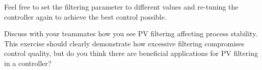 \vskip 10pt

Feel free to set the filtering parameter to different values and re-tuning the controller again to achieve the best control possible.

\vskip 10pt

Discuss with your teammates how you see PV filtering affecting process stability.  This exercise should clearly demonstrate how excessive filtering compromises control quality, but do you think there are beneficial applications for PV filtering in a controller?


















